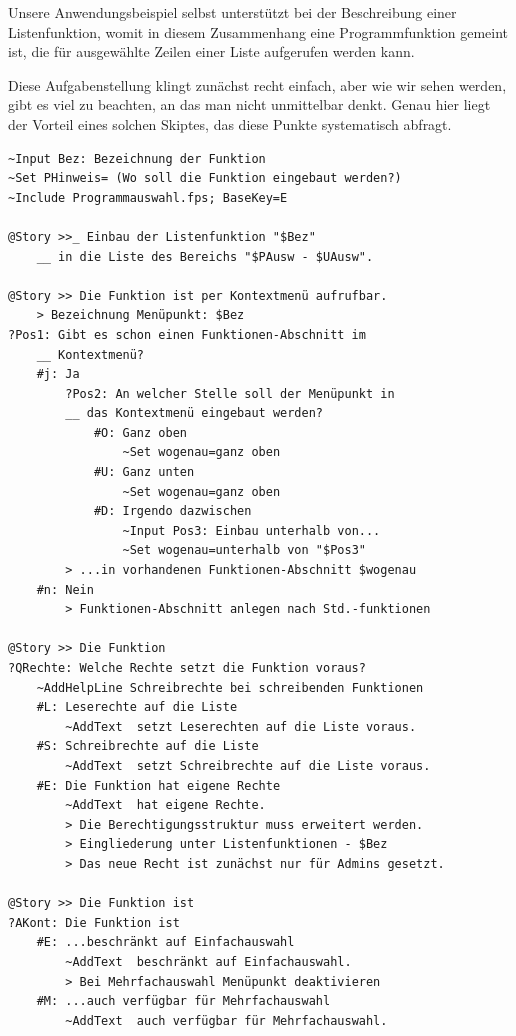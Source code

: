 Unsere Anwendungsbeispiel selbst unterstützt bei der Beschreibung einer Listenfunktion, womit in diesem Zusammenhang eine Programmfunktion gemeint ist, die für ausgewählte Zeilen einer Liste aufgerufen werden kann.

Diese Aufgabenstellung klingt zunächst recht einfach, aber wie wir sehen werden, gibt es viel zu beachten, an das man nicht unmittelbar denkt. Genau hier liegt der Vorteil eines solchen Skiptes, das diese Punkte systematisch abfragt.

\label{BspListenfunktion}
\begin{verbatim}
~Input Bez: Bezeichnung der Funktion
~Set PHinweis= (Wo soll die Funktion eingebaut werden?)
~Include Programmauswahl.fps; BaseKey=E

@Story >>_ Einbau der Listenfunktion "$Bez"
    __ in die Liste des Bereichs "$PAusw - $UAusw".

@Story >> Die Funktion ist per Kontextmenü aufrufbar.
    > Bezeichnung Menüpunkt: $Bez
?Pos1: Gibt es schon einen Funktionen-Abschnitt im
    __ Kontextmenü?
    #j: Ja
        ?Pos2: An welcher Stelle soll der Menüpunkt in
        __ das Kontextmenü eingebaut werden?
            #O: Ganz oben
                ~Set wogenau=ganz oben
            #U: Ganz unten
                ~Set wogenau=ganz oben
            #D: Irgendo dazwischen
                ~Input Pos3: Einbau unterhalb von...
                ~Set wogenau=unterhalb von "$Pos3"
        > ...in vorhandenen Funktionen-Abschnitt $wogenau
    #n: Nein
        > Funktionen-Abschnitt anlegen nach Std.-funktionen

@Story >> Die Funktion
?QRechte: Welche Rechte setzt die Funktion voraus?
    ~AddHelpLine Schreibrechte bei schreibenden Funktionen
    #L: Leserechte auf die Liste
        ~AddText  setzt Leserechten auf die Liste voraus.
    #S: Schreibrechte auf die Liste
        ~AddText  setzt Schreibrechte auf die Liste voraus.
    #E: Die Funktion hat eigene Rechte
        ~AddText  hat eigene Rechte.
        > Die Berechtigungsstruktur muss erweitert werden.
        > Eingliederung unter Listenfunktionen - $Bez
        > Das neue Recht ist zunächst nur für Admins gesetzt.

@Story >> Die Funktion ist
?AKont: Die Funktion ist
    #E: ...beschränkt auf Einfachauswahl
        ~AddText  beschränkt auf Einfachauswahl.
        > Bei Mehrfachauswahl Menüpunkt deaktivieren
    #M: ...auch verfügbar für Mehrfachauswahl
        ~AddText  auch verfügbar für Mehrfachauswahl.


\end{verbatim}
